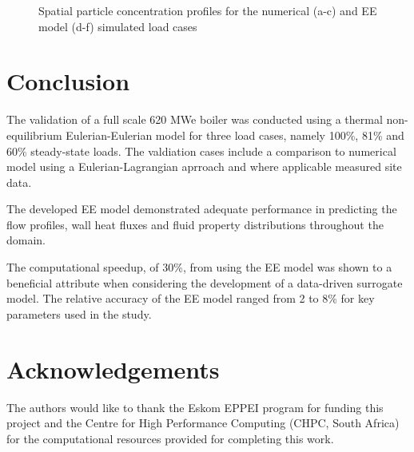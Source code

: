 \documentclass{webofc}
\begin{document}
\begin{figure}[h!]
\setlength{\belowcaptionskip}{0pt} 
\caption{Spatial particle concentration profiles for the numerical (a-c) and EE model (d-f) simulated load cases}
\label{fig_concentration}
\end{figure}
\newpage

\section{Conclusion}
The validation of a full scale 620 MWe boiler was conducted using a thermal non-equilibrium Eulerian-Eulerian model for three load cases, namely 100\%, 81\% and 60\% steady-state loads. The valdiation cases include a comparison to numerical model using a Eulerian-Lagrangian aprroach and where applicable measured site data.

The developed EE model demonstrated adequate performance in predicting the flow profiles, wall heat fluxes and fluid property distributions throughout the domain.

The computational speedup, of 30\%, from using the EE model was shown to a beneficial attribute when considering the development of a data-driven surrogate model. The relative accuracy of the EE model ranged from 2 to 8\% for key parameters used in the study.

\section*{Acknowledgements}
The authors would like to thank the Eskom EPPEI program for funding this project and the Centre for High Performance Computing (CHPC, South Africa) for the computational resources provided for completing this work.

%
% 
%
%
\end{document}

